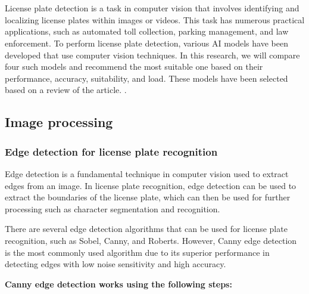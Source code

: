 \chapter{}
\label{chap:license-plate-recognition}

License plate detection is a task in computer vision that involves identifying
and localizing license plates within images or videos. This task has numerous
practical applications, such as automated toll collection, parking management,
and law enforcement. To perform license plate detection, various AI models have
been developed that use computer vision techniques. In this research, we will
compare four such models and recommend the most suitable one based on their
performance, accuracy, suitability, and load. These models have been selected
based on a review of the article. \cite{lic:license-plate}.

\section{Image processing}

\subsection{Edge detection for license plate recognition}

Edge detection is a fundamental technique in computer vision used to extract
edges from an image. In license plate recognition, edge detection can be used
to extract the boundaries of the license plate, which can then be used for
further processing such as character segmentation and recognition.

There are several edge detection algorithms that can be used for license plate
recognition, such as Sobel, Canny, and Roberts. However, Canny edge detection
is the most commonly used algorithm due to its superior performance in
detecting edges with low noise sensitivity and high accuracy.
\cite{egde:edge-dection}

\textbf{Canny edge detection works using the following steps:}

